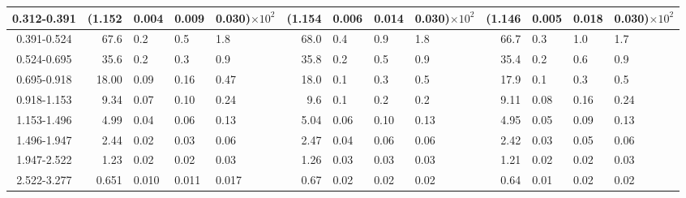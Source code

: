 \begin{table}[!htbp]
{\begin{tabular}{ | c | r@{$\pm$}l@{$\pm$}l@{$\pm$}l | r@{$\pm$}l@{$\pm$}l@{$\pm$}l | r@{$\pm$}l@{$\pm$}l@{$\pm$}l |}
0.312-0.391 & (1.152&0.004&0.009&0.030)$\times 10^{2}$ & (1.154&0.006&0.014&0.030)$\times 10^{2}$ & (1.146&0.005&0.018&0.030)$\times 10^{2}$ \\ \hline
0.391-0.524 & 67.6&0.2&0.5&1.8 & 68.0&0.4&0.9&1.8 & 66.7&0.3&1.0&1.7 \\ \hline
0.524-0.695 & 35.6&0.2&0.3&0.9 & 35.8&0.2&0.5&0.9 & 35.4&0.2&0.6&0.9 \\ \hline
0.695-0.918 & 18.00&0.09&0.16&0.47 & 18.0&0.1&0.3&0.5 & 17.9&0.1&0.3&0.5 \\ \hline
0.918-1.153 & 9.34&0.07&0.10&0.24 & 9.6&0.1&0.2&0.2 & 9.11&0.08&0.16&0.24 \\ \hline
1.153-1.496 & 4.99&0.04&0.06&0.13 & 5.04&0.06&0.10&0.13 & 4.95&0.05&0.09&0.13 \\ \hline
1.496-1.947 & 2.44&0.02&0.03&0.06 & 2.47&0.04&0.06&0.06 & 2.42&0.03&0.05&0.06 \\ \hline
1.947-2.522 & 1.23&0.02&0.02&0.03 & 1.26&0.03&0.03&0.03 & 1.21&0.02&0.02&0.03 \\ \hline
2.522-3.277 & 0.651&0.010&0.011&0.017 & 0.67&0.02&0.02&0.02 & 0.64&0.01&0.02&0.02 \\ \hline
\end{tabular}}
\end{table}
\clearpage
